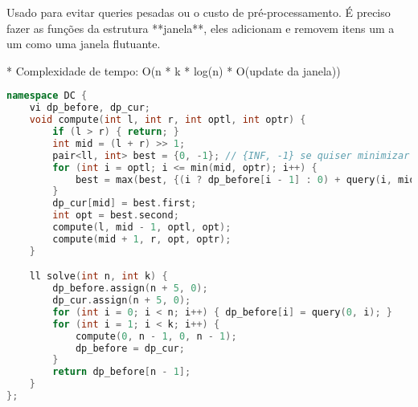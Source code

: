 \documentclass[11pt, a4paper, twoside]{article}
\begin{document}
Usado para evitar queries pesadas ou o custo de pré-processamento.  
É preciso fazer as funções da estrutura **janela**, eles adicionam e removem itens um a um como uma janela flutuante.

* Complexidade de tempo: O(n * k * log(n) * O(update da janela))



\begin{lstlisting}[language=C++]
namespace DC {
    vi dp_before, dp_cur;
    void compute(int l, int r, int optl, int optr) {
        if (l > r) { return; }
        int mid = (l + r) >> 1;
        pair<ll, int> best = {0, -1}; // {INF, -1} se quiser minimizar
        for (int i = optl; i <= min(mid, optr); i++) {
            best = max(best, {(i ? dp_before[i - 1] : 0) + query(i, mid), i}); // min() se quiser minimizar
        }
        dp_cur[mid] = best.first;
        int opt = best.second;
        compute(l, mid - 1, optl, opt);
        compute(mid + 1, r, opt, optr);
    }

    ll solve(int n, int k) {
        dp_before.assign(n + 5, 0);
        dp_cur.assign(n + 5, 0);
        for (int i = 0; i < n; i++) { dp_before[i] = query(0, i); }
        for (int i = 1; i < k; i++) {
            compute(0, n - 1, 0, n - 1);
            dp_before = dp_cur;
        }
        return dp_before[n - 1];
    }
};
\end{lstlisting}
\end{document}
